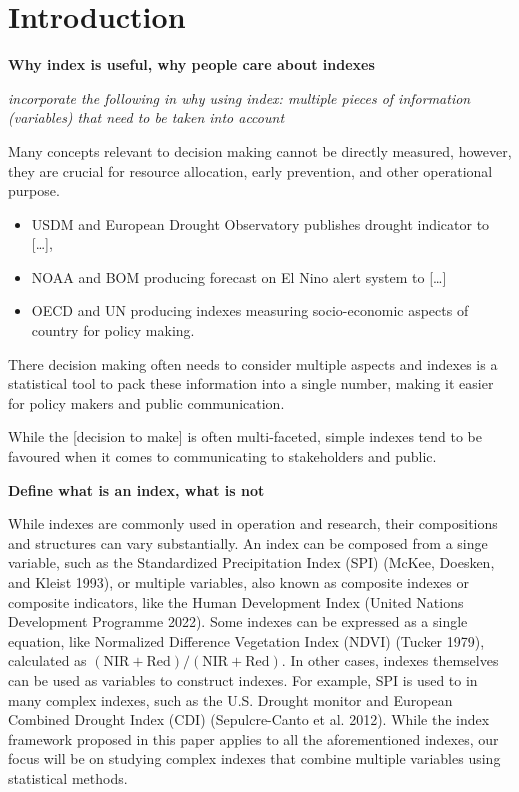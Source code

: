 \documentclass[
]{interact}
\providecommand{\tightlist}{%
  \setlength{\itemsep}{0pt}\setlength{\parskip}{0pt}}\usepackage{longtable,booktabs,array}
\begin{document}
\hypertarget{introduction}{%
\section{Introduction}\label{introduction}}

\textbf{Why index is useful, why people care about indexes}

\emph{incorporate the following in why using index: multiple pieces of
information (variables) that need to be taken into account}

Many concepts relevant to decision making cannot be directly measured,
however, they are crucial for resource allocation, early prevention, and
other operational purpose.

\begin{itemize}
\tightlist
\item
  USDM and European Drought Observatory publishes drought indicator to
  {[}\ldots{]},
\item
  NOAA and BOM producing forecast on El Nino alert system to
  {[}\ldots{]}
\item
  OECD and UN producing indexes measuring socio-economic aspects of
  country for policy making.
\end{itemize}

There decision making often needs to consider multiple aspects and
indexes is a statistical tool to pack these information into a single
number, making it easier for policy makers and public communication.

While the {[}decision to make{]} is often multi-faceted, simple indexes
tend to be favoured when it comes to communicating to stakeholders and
public.

\textbf{Define what is an index, what is not}

While indexes are commonly used in operation and research, their
compositions and structures can vary substantially. An index can be
composed from a singe variable, such as the Standardized Precipitation
Index (SPI) (McKee, Doesken, and Kleist 1993), or multiple variables,
also known as composite indexes or composite indicators, like the Human
Development Index (United Nations Development Programme 2022). Some
indexes can be expressed as a single equation, like Normalized
Difference Vegetation Index (NDVI) (Tucker 1979), calculated as
\((\text{NIR} + \text{Red})/(\text{NIR} + \text{Red})\). In other cases,
indexes themselves can be used as variables to construct indexes. For
example, SPI is used to in many complex indexes, such as the U.S.
Drought monitor and European Combined Drought Index (CDI)
(Sepulcre-Canto et al. 2012). While the index framework proposed in this
paper applies to all the aforementioned indexes, our focus will be on
studying complex indexes that combine multiple variables using
statistical methods.
\end{document}
